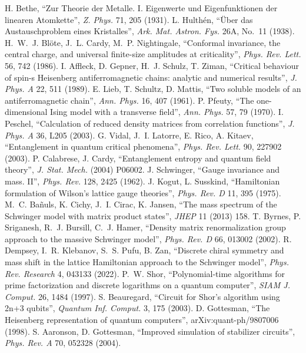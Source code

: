  H. Bethe, ``Zur Theorie der Metalle. I. Eigenwerte und Eigenfunktionen der linearen Atomkette'', \emph{Z. Phys.}
71, 205 (1931).
 L. Hulth\'en, ``\"Uber das Austauschproblem eines Kristalles'', \emph{Ark. Mat. Astron. Fys.} 26A, No.~11 (1938).
 H.~W.~J. Bl\"ote, J.~L. Cardy, M.~P. Nightingale, ``Conformal invariance, the central charge, and universal
finite-size amplitudes at criticality'', \emph{Phys. Rev. Lett.} 56, 742 (1986).
 I. Affleck, D. Gepner, H.~J. Schulz, T. Ziman, ``Critical behaviour of spin-s Heisenberg antiferromagnetic
chains: analytic and numerical results'', \emph{J. Phys. A} 22, 511 (1989).
 E. Lieb, T. Schultz, D. Mattis, ``Two soluble models of an antiferromagnetic chain'', \emph{Ann. Phys.} 16, 407
(1961).
 P. Pfeuty, ``The one-dimensional Ising model with a transverse field'', \emph{Ann. Phys.} 57, 79 (1970).
 I. Peschel, ``Calculation of reduced density matrices from correlation functions'', \emph{J. Phys. A} 36, L205
(2003).
 G. Vidal, J.~I. Latorre, E. Rico, A. Kitaev, ``Entanglement in quantum critical phenomena'', \emph{Phys. Rev. Lett.}
90, 227902 (2003).
 P. Calabrese, J. Cardy, ``Entanglement entropy and quantum field theory'', \emph{J. Stat. Mech.} (2004) P06002.
 J. Schwinger, ``Gauge invariance and mass. II'', \emph{Phys. Rev.} 128, 2425 (1962).
 J. Kogut, L. Susskind, ``Hamiltonian formulation of Wilson's lattice gauge theories'', \emph{Phys. Rev. D} 11, 395
(1975).
 M.~C. Ba\~nuls, K. Cichy, J.~I. Cirac, K. Jansen, ``The mass spectrum of the Schwinger model with matrix product
states'', \emph{JHEP} 11 (2013) 158.
 T. Byrnes, P. Sriganesh, R.~J. Bursill, C.~J. Hamer, ``Density matrix renormalization group approach to the massive
Schwinger model'', \emph{Phys. Rev. D} 66, 013002 (2002).
 R. Dempsey, I.~R. Klebanov, S.~S. Pufu, B. Zan, ``Discrete chiral symmetry and mass shift in the lattice
Hamiltonian approach to the Schwinger model'', \emph{Phys. Rev. Research} 4, 043133 (2022).
 P.~W. Shor, ``Polynomial-time algorithms for prime factorization and discrete logarithms on a quantum computer'',
\emph{SIAM J. Comput.} 26, 1484 (1997).
 S. Beauregard, ``Circuit for Shor's algorithm using 2n+3 qubits'', \emph{Quantum Inf. Comput.} 3, 175 (2003).
 D. Gottesman, ``The Heisenberg representation of quantum computers'', arXiv:quant-ph/9807006 (1998).
 S. Aaronson, D. Gottesman, ``Improved simulation of stabilizer circuits'', \emph{Phys. Rev. A} 70, 052328 (2004).
